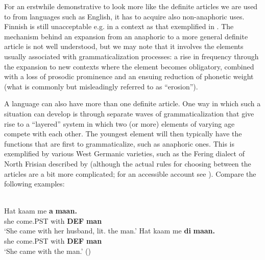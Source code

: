 \z

For an erstwhile demonstrative to look more like the definite articles we are used to from languages such as English, it has to acquire also non-anaphoric uses. Finnish is still unacceptable e.g. in a context as that exemplified in . The mechanism behind an expansion from an anaphoric to a more general definite article is not well understood, but we may note that it involves the elements usually associated with grammaticalization processes: a rise in frequency through the expansion to new contexts where the element becomes obligatory, combined with a loss of prosodic prominence and an ensuing reduction of phonetic weight (what is commonly but misleadingly referred to as “erosion”). 

A language can also have more than one definite article. One way in which such a situation can develop is through separate waves of grammaticalization that give rise to a “layered” system in which two (or more) elements of varying age compete with each other. The youngest element will then typically have the functions that are first to grammaticalize, such as anaphoric ones. This is exemplified by various West Germanic varieties, such as the Fering dialect of North Frisian described by \citet{Ebert1971} (although the actual rules for choosing between the articles are a bit more complicated; for an accessible account see \citet[162]{Lyons1999}). Compare the following examples:

\ea\label{}
\\
\ea 
	\gll 	Hat  kaam  me  \textbf{a} \textbf{maan.}\\
			she  come.PST  with  \textbf{DEF} \textbf{man}\\
	\glt 	‘She came with her husband, lit. the man.’
\ex
	\gll	Hat  kaam  me  \textbf{di} \textbf{  maan.}\\
			she  come.PST  with  \textbf{DEF} \textbf{man}\\
	\glt	‘She came with the man.’ (\citet[163]{Lyons1999})

	\z 
\z

